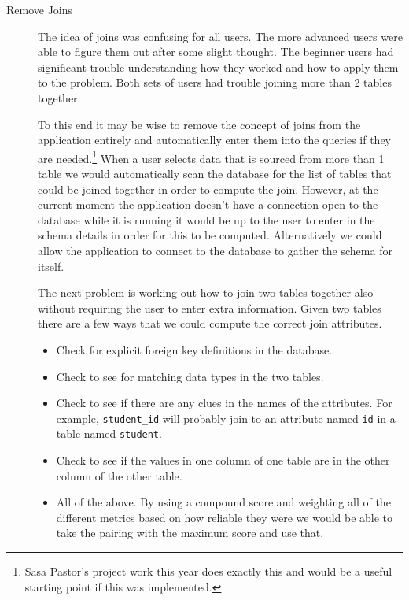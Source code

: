 \begin{description}

\item[Remove Joins] \hfill

The idea of joins was confusing for all users. The more advanced users were
able to figure them out after some slight thought. The beginner users had
significant trouble understanding how they worked and how to apply them to the
problem. Both sets of users had trouble joining more than 2 tables together.

To this end it may be wise to remove the concept of joins from the application
entirely and automatically enter them into the queries if they are
needed.\footnote{Sasa Pastor's project work this year does exactly this and
would be a useful starting point if this was implemented.} When a user selects
data that is sourced from more than 1 table we would automatically scan the
database for the list of tables that could be joined together in order to
compute the join. However, at the current moment the application doesn't have
a connection open to the database while it is running it would be up to the
user to enter in the schema details in order for this to be computed.
Alternatively we could allow the application to connect to the database to
gather the schema for itself.

The next problem is working out how to join two tables together also without
requiring the user to enter extra information. Given two tables there are a few
ways that we could compute the correct join attributes.

\begin{itemize}

\item Check for explicit foreign key definitions in the database.

\item Check to see for matching data types in the two tables.

\item Check to see if there are any clues in the names of the attributes. For
	example, \texttt{student\_id} will probably join to an attribute named
	\texttt{id} in a table named \texttt{student}.

\item Check to see if the values in one column of one table are in the other
	column of the other table.

\item All of the above. By using a compound score and weighting all of the
	different metrics based on how reliable they were we would be able to take
	the pairing with the maximum score and use that.


\end{itemize}
\end{description}
